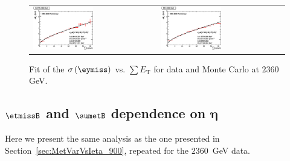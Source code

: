 \begin{figure}[h!]
 \centering
 \begin{tabular}{ll}
  \includegraphics[width=0.5\textwidth]{plots_DataVsMC_MB_2360GeV/final_metysigma_sumet_DATA_2360.eps} &
  \includegraphics[width=0.5\textwidth]{plots_DataVsMC_MB_2360GeV/final_metysigma_sumet_MC_2360.eps} \\
 \end{tabular}
 \caption{\small Fit of the $\sigma\left(\eymiss\right)$ vs. $\sum E_\text{T}$ for data and Monte Carlo at $2360$ GeV.\label{fig:MEySigma_vs_SumET_2360_fit}}
\end{figure}

\clearpage

\subsection[$\etmiss$ and $\sumet$ dependence on $\eta$]{$\etmissB$ and $\sumetB$ dependence on $\boldsymbol{\eta}$} \label{sec:MetVarVsIeta_2360}

Here we present the same analysis as the one presented in Section~\ref{sec:MetVarVsIeta_900}, repeated for the $2360$~GeV data. 

